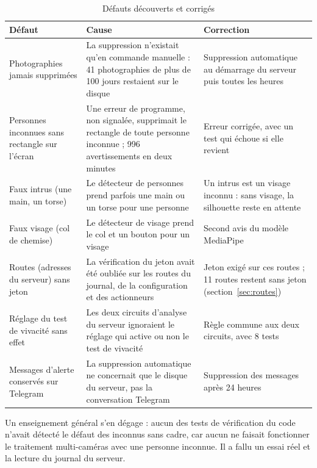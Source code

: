 \begin{table}[H]
\centering
\caption{Défauts découverts et corrigés\majmark}\label{tab:defauts}
\small
\begin{tabularx}{\textwidth}{@{}>{\raggedright\arraybackslash}p{3.3cm}>{\raggedright\arraybackslash}X>{\raggedright\arraybackslash}X@{}}
\toprule
\textbf{Défaut} & \textbf{Cause} & \textbf{Correction} \\
\midrule
Photographies jamais supprimées & La suppression n'existait qu'en commande manuelle : 41 photographies de plus de 100 jours restaient sur le disque & Suppression automatique au démarrage du serveur puis toutes les heures \\
Personnes inconnues sans rectangle sur l'écran & Une erreur de programme, non signalée, supprimait le rectangle de toute personne inconnue ; 996 avertissements en deux minutes & Erreur corrigée, avec un test qui échoue si elle revient \\
Faux intrus (une main, un torse) & Le détecteur de personnes prend parfois une main ou un torse pour une personne & Un intrus est un visage inconnu : sans visage, la silhouette reste en attente \\
Faux visage (col de chemise) & Le détecteur de visage prend le col et un bouton pour un visage & Second avis du modèle MediaPipe \\
Routes (adresses du serveur) sans jeton & La vérification du jeton avait été oubliée sur les routes du journal, de la configuration et des actionneurs & Jeton exigé sur ces routes ; 11 routes restent sans jeton (section~\ref{sec:routes}) \\
Réglage du test de vivacité sans effet & Les deux circuits d'analyse du serveur ignoraient le réglage qui active ou non le test de vivacité & Règle commune aux deux circuits, avec 8 tests \\
Messages d'alerte conservés sur Telegram & La suppression automatique ne concernait que le disque du serveur, pas la conversation Telegram & Suppression des messages après 24 heures \\
\bottomrule
\end{tabularx}
\end{table}

\begin{maj}
Un enseignement général s'en dégage : aucun des tests de vérification du code n'avait détecté le défaut des inconnus sans cadre, car aucun ne faisait fonctionner le traitement multi-caméras avec une personne inconnue. Il a fallu un essai réel et la lecture du journal du serveur.
\end{maj}

